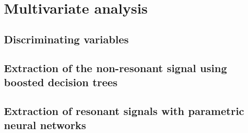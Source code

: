 \section{Multivariate analysis}

\subsection{Discriminating variables}

\subsection{Extraction of the non-resonant signal using boosted decision trees}

\subsection{Extraction of resonant signals with parametric neural networks}


